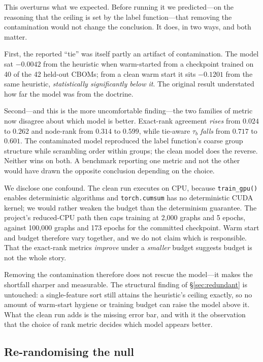 \documentclass[conference]{IEEEtran}
\newcommand{\code}[1]{\texttt{\small #1}}
\begin{document}
This overturns what we expected. Before running it we predicted---on the reasoning that the
ceiling is set by the label function---that removing the contamination would not change the
conclusion. It does, in two ways, and both matter.

First, the reported ``tie'' was itself partly an artifact of contamination. The model sat
$-0.0042$ from the heuristic when warm-started from a checkpoint trained on 40 of the 42
held-out CBOMs; from a clean warm start it sits $-0.1201$ from the same heuristic,
\emph{statistically significantly below it}. The original result understated how far the
model was from the doctrine.

Second---and this is the more uncomfortable finding---the two families of metric now
disagree about which model is better. Exact-rank agreement \emph{rises} from $0.024$ to
$0.262$ and node-rank from $0.314$ to $0.599$, while tie-aware $\tau_b$ \emph{falls} from
$0.717$ to $0.601$. The contaminated model reproduced the label function's coarse group
structure while scrambling order within groups; the clean model does the reverse. Neither
wins on both. A benchmark reporting one metric and not the other would have drawn the
opposite conclusion depending on the choice.

We disclose one confound. The clean run executes on CPU, because \code{train\_gpu()} enables
deterministic algorithms and \code{torch.cumsum} has no deterministic CUDA kernel; we would
rather weaken the budget than the determinism guarantee. The project's reduced-CPU path then
caps training at 2{,}000 graphs and 5 epochs, against 100{,}000 graphs and 173 epochs for
the committed checkpoint. Warm start and budget therefore vary together, and we do not claim
which is responsible. That the exact-rank metrics \emph{improve} under a \emph{smaller}
budget suggests budget is not the whole story.

Removing the contamination therefore does not rescue the model---it makes the shortfall
sharper and measurable. The structural finding of \S\ref{sec:redundant} is untouched: a
single-feature sort still attains the heuristic's ceiling exactly, so no amount of warm-start
hygiene or training budget can raise the model above it. What the clean run adds is the
missing error bar, and with it the observation that the choice of rank metric decides which
model appears better.

\subsection{Re-randomising the null}
\end{document}
